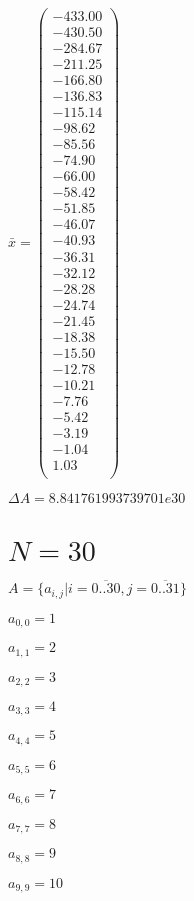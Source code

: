 \documentclass[a4paper,12pt]{article}
\begin{document}
$\bar { x } = \begin{pmatrix}
-433.00 \\
-430.50 \\
-284.67 \\
-211.25 \\
-166.80 \\
-136.83 \\
-115.14 \\
-98.62 \\
-85.56 \\
-74.90 \\
-66.00 \\
-58.42 \\
-51.85 \\
-46.07 \\
-40.93 \\
-36.31 \\
-32.12 \\
-28.28 \\
-24.74 \\
-21.45 \\
-18.38 \\
-15.50 \\
-12.78 \\
-10.21 \\
-7.76 \\
-5.42 \\
-3.19 \\
-1.04 \\
1.03 \\
\end{pmatrix}
$

$\Delta A = 8.841761993739701e30$



\section{ $N = 30$ }
$A = \{ a _{ i, j } | i = \overline { 0..30 }, j = \overline { 0..31 } \}$

$a _{ 0, 0 } = 1$

$a _{ 1, 1 } = 2$

$a _{ 2, 2 } = 3$

$a _{ 3, 3 } = 4$

$a _{ 4, 4 } = 5$

$a _{ 5, 5 } = 6$

$a _{ 6, 6 } = 7$

$a _{ 7, 7 } = 8$

$a _{ 8, 8 } = 9$

$a _{ 9, 9 } = 10$
\end{document}
